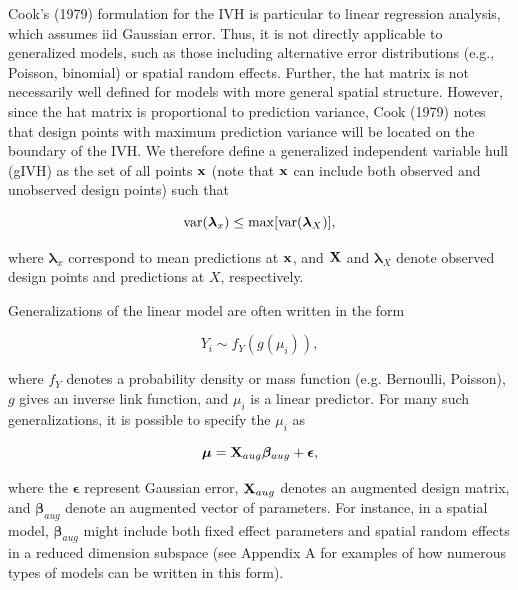 \documentclass[12pt,english]{article}
\begin{document}
\begin{spacing}{1.9}
Cook's (1979) formulation for the IVH is particular to linear regression analysis, which assumes iid Gaussian error. Thus, it is not directly applicable to generalized models, such as those including alternative error distributions (e.g., Poisson, binomial) or spatial random effects.  Further, the hat matrix is not necessarily well defined for models with more general spatial structure. However, since the hat matrix is proportional to prediction variance, Cook (1979) notes that design points with maximum prediction variance will be located on the boundary of the IVH.  We therefore define a generalized independent variable hull (gIVH) as the set of all points ${\bf x}$ (note that ${\bf x}$ can include both observed and unobserved design points) such that
\begin{linenomath*}
\begin{equation}
  \label{eq:gIVH}
  {\rm var}(\boldsymbol{\lambda}_x) \le {\rm max} [{\rm var}(\boldsymbol{\lambda}_X)],
\end{equation}
\end{linenomath*}
where $\boldsymbol{\lambda}_x$ correspond to mean predictions at ${\bf x}$, and ${\bf X}$ and $\boldsymbol{\lambda}_X$ denote observed design points and predictions at $X$, respectively.

Generalizations of the linear model are often written in the form
\begin{linenomath*}
\begin{equation}
  Y_i \sim f_Y(g(\mu_i)),
\end{equation}
\end{linenomath*}
where $f_Y$ denotes a probability density or mass function (e.g. Bernoulli, Poisson), $g$ gives an inverse link function, and
$\mu_i$ is a linear predictor.  For many such generalizations, it is possible to specify the $\mu_i$ as
\begin{linenomath*}
\begin{equation}
  \boldsymbol{\mu} = {\bf X}_{aug}\boldsymbol{\beta}_{aug} + \boldsymbol{\epsilon},
  \label{eq:mu-aug}
\end{equation}
\end{linenomath*}
where the $\boldsymbol{\epsilon}$ represent Gaussian error, ${\bf X}_{aug}$ denotes an augmented design matrix, and $\boldsymbol{\beta}_{aug}$ denote an augmented vector of parameters.  For instance, in a spatial model, $\boldsymbol{\beta}_{aug}$ might include both fixed effect parameters and spatial random effects in a reduced dimension subspace (see Appendix A for examples of how numerous types of models can be written in this form).


\end{spacing}
\end{document}
